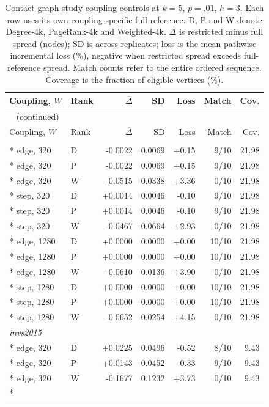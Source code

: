 \begin{longtable}{llrrrrr}
\caption{Contact-graph study coupling controls at $k=5$, $p=.01$, $h=3$. Each row uses its own coupling-specific full reference. D, P and W denote Degree-4k, PageRank-4k and Weighted-4k. $\Delta$ is restricted minus full spread (nodes); SD is across replicates; loss is the mean pathwise incremental loss (\%), negative when restricted spread exceeds full-reference spread. Match counts refer to the entire ordered sequence. Coverage is the fraction of eligible vertices (\%).}\label{tab:hist-coupling}\\
\toprule
Coupling, $W$ & Rank & $\overline\Delta$ & SD & Loss & Match & Cov. \\
\midrule
\endfirsthead
\multicolumn{7}{l}{\tablename~\thetable{} (continued)}\\
\toprule
Coupling, $W$ & Rank & $\overline\Delta$ & SD & Loss & Match & Cov. \\
\midrule
\endhead
\bottomrule
\endfoot
\multicolumn{7}{l}{\textit{invs2013}}\\*
edge, 320 & D & -0.0022 & 0.0069 & +0.15 & 9/10 & 21.98\\*
edge, 320 & P & -0.0022 & 0.0069 & +0.15 & 9/10 & 21.98\\*
edge, 320 & W & -0.0515 & 0.0338 & +3.36 & 0/10 & 21.98\\*
step, 320 & D & +0.0014 & 0.0046 & -0.10 & 9/10 & 21.98\\*
step, 320 & P & +0.0014 & 0.0046 & -0.10 & 9/10 & 21.98\\*
step, 320 & W & -0.0467 & 0.0664 & +2.93 & 0/10 & 21.98\\*
edge, 1280 & D & +0.0000 & 0.0000 & +0.00 & 10/10 & 21.98\\*
edge, 1280 & P & +0.0000 & 0.0000 & +0.00 & 10/10 & 21.98\\*
edge, 1280 & W & -0.0610 & 0.0136 & +3.90 & 0/10 & 21.98\\*
step, 1280 & D & +0.0000 & 0.0000 & +0.00 & 10/10 & 21.98\\*
step, 1280 & P & +0.0000 & 0.0000 & +0.00 & 10/10 & 21.98\\*
step, 1280 & W & -0.0652 & 0.0254 & +4.15 & 0/10 & 21.98\\
\multicolumn{7}{l}{\textit{invs2015}}\\*
edge, 320 & D & +0.0225 & 0.0496 & -0.52 & 8/10 & 9.43\\*
edge, 320 & P & +0.0143 & 0.0452 & -0.33 & 9/10 & 9.43\\*
edge, 320 & W & -0.1677 & 0.1232 & +3.73 & 0/10 & 9.43\\*

\end{longtable}
